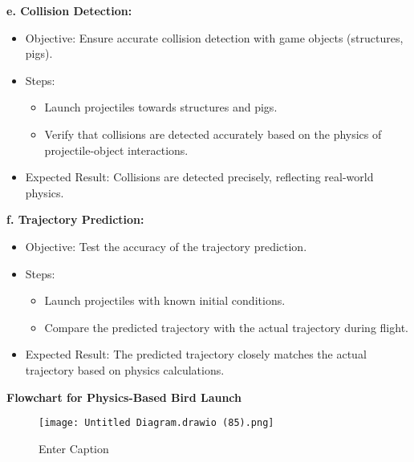 \documentclass[
]{article}
\begin{document}
\textbf{e. Collision Detection:}

\begin{itemize}
\item
  Objective: Ensure accurate collision detection with game objects
  (structures, pigs).
\item
  Steps:

  \begin{itemize}
  \item
    Launch projectiles towards structures and pigs.
  \item
    Verify that collisions are detected accurately based on the physics
    of projectile-object interactions.
  \end{itemize}
\item
  Expected Result: Collisions are detected precisely, reflecting
  real-world physics.
\end{itemize}

\textbf{f. Trajectory Prediction:}

\begin{itemize}
\item
  Objective: Test the accuracy of the trajectory prediction.
\item
  Steps:

  \begin{itemize}
  \item
    Launch projectiles with known initial conditions.
  \item
    Compare the predicted trajectory with the actual trajectory during
    flight.
  \end{itemize}
\item
  Expected Result: The predicted trajectory closely matches the actual
  trajectory based on physics calculations.
\end{itemize}

\textbf{Flowchart for Physics-Based Bird Launch}

\begin{figure}
    \centering
    \texttt{[image: Untitled Diagram.drawio (85).png]}
    \caption{Enter Caption}
    \label{fig:enter-label}
\end{figure}
\end{document}
